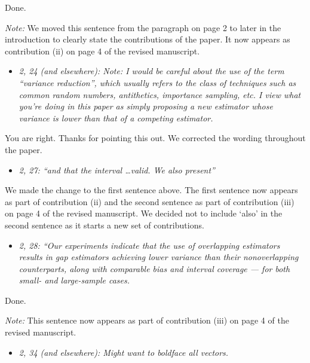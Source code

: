 \documentclass[11pt,notitlepage,onecolumn]{article}
\newcommand{\noi}{\noindent}
\begin{document}
\noi
Done.
\medskip 

\noi
{\it Note:}  We moved this sentence from the paragraph on page 2 to later in the introduction to clearly state the contributions of the paper. 
It now appears as contribution (ii) on page 4 of the revised manuscript.
\medskip 

\begin{itemize}
\item[] \textit{2, 24 (and elsewhere): Note: I would be careful about the use of the term ``variance reduction'', which usually refers to the class of techniques such as common random numbers, antithetics, importance sampling, etc. 
I view what you're doing in this paper as simply proposing a new estimator whose variance is lower than that of a competing estimator.}
\end{itemize}

\noi
You are right. 
Thanks for pointing this out. 
We corrected the wording throughout the paper. 
\medskip 


\begin{itemize}
\item[] \textit{2, 27: ``and that the interval \ldots valid. 
We also present''}
\end{itemize}

\noi
We made the change to the first sentence above. 
The first sentence now appears as part of contribution (ii) and the second sentence as part of contribution (iii) on page 4 of the revised manuscript. 
We decided not to include `also' in the second sentence as it starts a new set of contributions. 
\medskip 


\begin{itemize}
\item[] \textit{2, 28: ``Our experiments indicate that the use of overlapping estimators results in gap estimators achieving lower variance than their nonoverlapping counterparts, along with comparable bias and interval coverage --- for both small- and large-sample cases.}
\end{itemize}

\noi
Done.
\medskip 

\noi
{\it Note:} 
This sentence now appears as part of contribution (iii) on page 4 of the revised manuscript.
\medskip 

\begin{itemize}
\item[] \textit{2, 34 (and elsewhere): Might want to boldface all vectors.}
\end{itemize}
\end{document}
